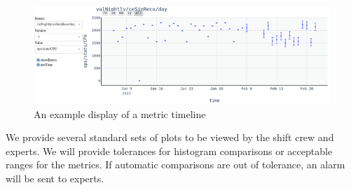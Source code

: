 \begin{figure}[htb]
\begin{center}
\includegraphics[width=0.9\linewidth]{figures/dqm_timeline.png}
\caption{An example display of a metric timeline}
\label{fig:timeline}
\end{center}
\end{figure}


We provide several standard sets of plots to be viewed by the shift crew and experts.  We will provide tolerances for histogram comparisons or acceptable ranges for the metrics.  If automatic comparisons are out of tolerance, an alarm will be sent to experts.
